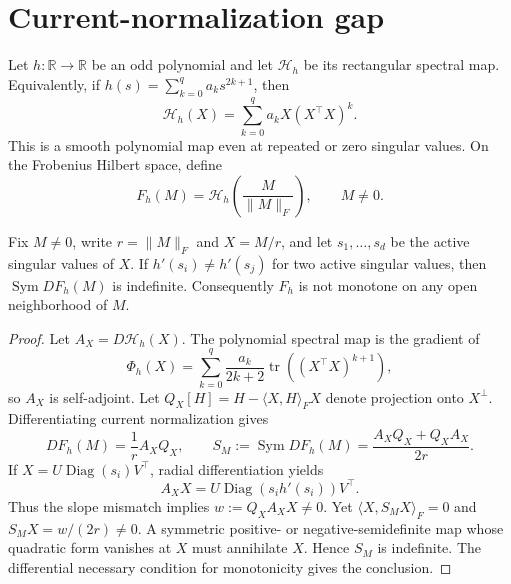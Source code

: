 \section{Current-normalization gap}

Let $h:\mathbb{R}\to\mathbb{R}$ be an odd polynomial and let
$\mathcal H_h$ be its rectangular spectral map.  Equivalently, if
$h(s)=\sum_{k=0}^q a_ks^{2k+1}$, then
\begin{equation}
  \mathcal H_h(X)=\sum_{k=0}^q a_kX(X^\top X)^k.
\end{equation}
This is a smooth polynomial map even at repeated or zero singular values.  On
the Frobenius Hilbert space, define
\begin{equation}
  F_h(M)=\mathcal H_h\!\left(\frac{M}{\lVert M\rVert_F}\right),
  \qquad M\ne0.
\end{equation}

\begin{theorem}
  Fix $M\ne0$, write $r=\lVert M\rVert_F$ and $X=M/r$, and let
  $s_1,\ldots,s_d$ be the active singular values of $X$.  If
  $h'(s_i)\ne h'(s_j)$ for two active singular values, then
  $\operatorname{Sym}DF_h(M)$ is indefinite.  Consequently $F_h$ is not
  monotone on any open neighborhood of $M$.
\end{theorem}

\begin{proof}
  Let $A_X=D\mathcal H_h(X)$.  The polynomial spectral map is the gradient of
  \begin{equation}
    \Phi_h(X)=\sum_{k=0}^q
      \frac{a_k}{2k+2}\operatorname{tr}\!\left((X^\top X)^{k+1}\right),
  \end{equation}
  so $A_X$ is self-adjoint.  Let
  $Q_X[H]=H-\langle X,H\rangle_FX$ denote projection onto $X^\perp$.
  Differentiating current normalization gives
  \begin{equation}
    DF_h(M)=\frac{1}{r}A_XQ_X,
    \qquad
    S_M:=\operatorname{Sym}DF_h(M)
       =\frac{A_XQ_X+Q_XA_X}{2r}.
  \end{equation}
  If $X=U\operatorname{Diag}(s_i)V^\top$, radial differentiation yields
  \begin{equation}
    A_XX=U\operatorname{Diag}(s_ih'(s_i))V^\top.
  \end{equation}
  Thus the slope mismatch implies $w:=Q_XA_XX\ne0$.  Yet
  $\langle X,S_MX\rangle_F=0$ and $S_MX=w/(2r)\ne0$.  A symmetric positive-
  or negative-semidefinite map whose quadratic form vanishes at $X$ must
  annihilate $X$.  Hence $S_M$ is indefinite.  The differential necessary
  condition for monotonicity gives the conclusion.
\end{proof}

